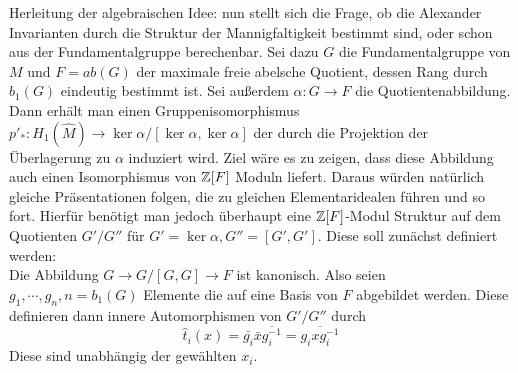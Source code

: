 Herleitung der algebraischen Idee: nun stellt sich die Frage, ob die Alexander Invarianten durch die Struktur der Mannigfaltigkeit bestimmt sind, oder schon aus der Fundamentalgruppe berechenbar. Sei dazu $G$ die Fundamentalgruppe von $M$ und $F=ab(G)$ der maximale freie abelsche Quotient, dessen Rang durch $b_1(G)$ eindeutig bestimmt ist. Sei außerdem $\alpha:G\to F$ die Quotientenabbildung. Dann erhält man einen Gruppenisomorphismus $p'_*: H_1(\hat M) \to \ker\alpha/[\ker\alpha,\ker\alpha]$ der durch die Projektion der Überlagerung zu $\alpha$ induziert wird. Ziel wäre es zu zeigen, dass diese Abbildung auch einen Isomorphismus von $\mathbb{Z}[F]$ Moduln liefert. Daraus würden natürlich gleiche Präsentationen folgen, die zu gleichen Elementaridealen führen und so fort. Hierfür benötigt man jedoch überhaupt eine $\mathbb{Z}[F]$-Modul Struktur auf dem Quotienten $G'/G''$ für $G'=\ker\alpha, G''=[G',G']$. Diese soll zunächst definiert werden:\\
Die Abbildung $G \to G/[G,G] \to F$ ist kanonisch. Also seien $g_1,\cdots,g_n,n=b_1(G)$ Elemente die auf eine Basis von $F$ abgebildet werden. Diese definieren dann innere Automorphismen von $G'/G''$ durch 
\[
	\hat t_i(x) = \bar{ g_i} \bar{ x}\overline{ g_i^{-1}} = \overline{{} g_i x g_i^{-1}}
\]
Diese sind unabhängig der gewählten $x_i$.
